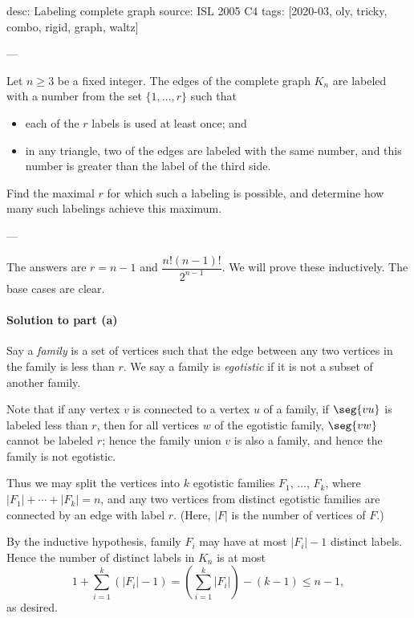 desc: Labeling complete graph
source: ISL 2005 C4
tags: [2020-03, oly, tricky, combo, rigid, graph, waltz]

---

Let $n\ge3$ be a fixed integer. The edges of the complete graph $K_n$ are labeled with a number from the set $\{1,\ldots,r\}$ such that
\begin{itemize}
    \item each of the $r$ labels is used at least once; and
    \item in any triangle, two of the edges are labeled with the same number, and this number is greater than the label of the third side.
\end{itemize}
Find the maximal $r$ for which such a labeling is possible, and determine how many such labelings achieve this maximum.

---

The answers are $r=n-1$ and $\dfrac{n!(n-1)!}{2^{n-1}}$. We will prove these inductively. The base cases are clear.

\paragraph{Solution to part (a)}     Say a \emph{family} is a set of vertices such that the edge between any two vertices in the family is less than $r$. We say a family is \emph{egotistic} if it is not a subset of another family.

Note that if any vertex $v$ is connected to a vertex $u$ of a family, if $\seg{vu}$ is labeled less than $r$, then for all vertices $w$ of the egotistic family, $\seg{vw}$ cannot be labeled $r$; hence the family union $v$ is also a family, and hence the family is not egotistic.

Thus we may split the vertices into $k$ egotistic families $F_1$, $\ldots$, $F_k$, where $|F_1|+\cdots+|F_k|=n$, and any two vertices from distinct egotistic families are connected by an edge with label $r$. (Here, $|F|$ is the number of vertices of $F$.)

By the inductive hypothesis, family $F_i$ may have at most $|F_i|-1$ distinct labels. Hence the number of distinct labels in $K_n$ is at most \[1+\sum_{i=1}^k(|F_i|-1)=\left(\sum_{i=1}^k|F_i|\right)-(k-1)\le n-1,\]
as desired.

